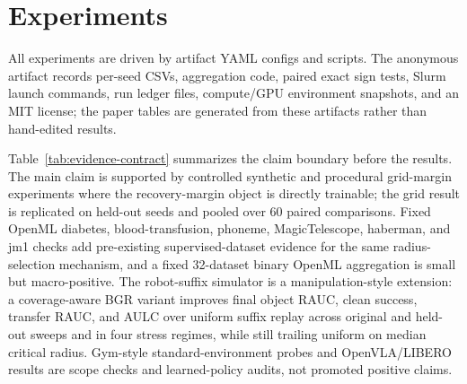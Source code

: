 \documentclass[letterpaper]{article}
\begin{document}
\section{Experiments}

All experiments are driven by artifact YAML configs and scripts. The anonymous artifact records per-seed CSVs, aggregation code, paired exact sign tests, Slurm launch commands, run ledger files, compute/GPU environment snapshots, and an MIT license; the paper tables are generated from these artifacts rather than hand-edited results.

\begin{table}[t]
\centering
\small
{}
\caption{Evidence contract used throughout the experiments. The central claim is mechanism-level margin expansion when recovery curves are directly trainable; standard-environment and learned-policy wins remain open requirements rather than hidden claims.}
\label{tab:evidence-contract}
\end{table}

Table~\ref{tab:evidence-contract} summarizes the claim boundary before the results. The main claim is supported by controlled synthetic and procedural grid-margin experiments where the recovery-margin object is directly trainable; the grid result is replicated on held-out seeds and pooled over 60 paired comparisons. Fixed OpenML diabetes, blood-transfusion, phoneme, MagicTelescope, haberman, and jm1 checks add pre-existing supervised-dataset evidence for the same radius-selection mechanism, and a fixed 32-dataset binary OpenML aggregation is small but macro-positive. The robot-suffix simulator is a manipulation-style extension: a coverage-aware BGR variant improves final object RAUC, clean success, transfer RAUC, and AULC over uniform suffix replay across original and held-out sweeps and in four stress regimes, while still trailing uniform on median critical radius. Gym-style standard-environment probes and OpenVLA/LIBERO results are scope checks and learned-policy audits, not promoted positive claims.
\end{document}
